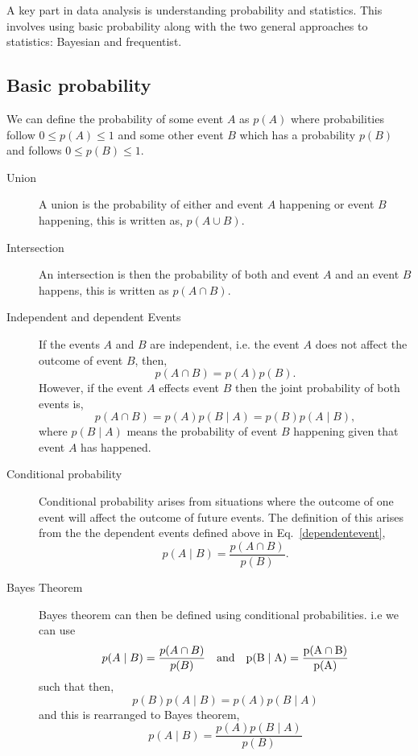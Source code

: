 A key part in data analysis is understanding probability and statistics. This involves using basic probability along with the two general approaches to statistics: Bayesian and frequentist. 

\subsection{\label{intro:prob:basic}Basic probability}

We can define the probability of some event $A$ as $p(A)$ where probabilities follow $0 \leq p(A) \leq 1$ and some other event $B$ which has a probability $p(B)$ and follows $0 \leq p(B) \leq 1$.

\begin{description}
\item [Union]
A union is the probability of either and event $A$ happening or event $B$ happening, this is written as, $p(A \cup B)$.

\item [Intersection]
An intersection is then the probability of both and event $A$ and an event $B$ happens, this is written as $p(A \cap B)$.

\item [Independent and dependent Events]
If the events $A$ and $B$ are independent, i.e. the event $A$ does not affect the outcome of event $B$, then,
\begin{equation}
p(A \cap B) = p(A)p(B).
\end{equation}
However, if the event $A$ effects event $B$ then the joint probability of both events is,
\begin{equation}
\label{dependentevent}
p(A \cap B) = p(A)p(B \mid A) = p(B)p(A \mid B),
\end{equation}
where $p(B \mid A)$ means the probability of event $B$ happening given that event $A$ has happened.

\item [Conditional probability]
Conditional probability arises from situations where the outcome of one event will affect the outcome of future events.
The definition of this arises from the the dependent events defined above in Eq.~\ref{dependentevent},
\begin{equation}
p(A \mid B) = \frac{p(A \cap B)}{p(B)}.
\end{equation}

\item [Bayes Theorem]
Bayes theorem can then be defined using conditional probabilities. i.e we can use
\begin{equation}
p(A \mid B) = \frac{p(A \cap B)}{p(B)} \quad \rm{and} \quad p(B \mid A) = \frac{p(A \cap B)}{p(A)}
\end{equation}
such that then,
\begin{equation}
p(B)p(A \mid B) = p(A)p(B \mid A)
\end{equation}
and this is rearranged to Bayes theorem,
\begin{equation}
p(A \mid B) = \frac{p(A)p(B \mid A)}{p(B)}
\end{equation}

\end{description}

